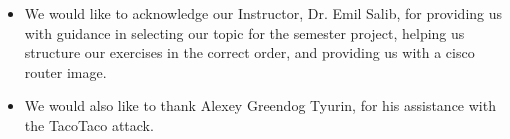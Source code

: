 \documentclass[main.tex]{subfiles}
\begin{document}
\begin{itemize}

\item We would like to acknowledge our Instructor, Dr. Emil Salib, for providing us with guidance in selecting our topic for the semester project, helping us structure our exercises in the correct order, and providing us with a cisco router image. 

\item We would also like to thank Alexey Greendog Tyurin, for his assistance with the TacoTaco attack.

\end{itemize}
\end{document}
